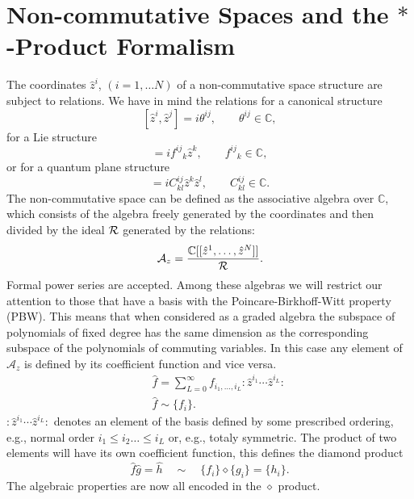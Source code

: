 \documentclass[a4paper,11pt]{article}
\newcommand{\newsection}{ \setcounter{equation}{0} \section}
\def\nn{\nonumber }
\def\Az{{\mathcal{A}_z}}
\def\z{\hat z}
\begin{document}
\newpage
\newsection{Non-commutative Spaces and the $*$-Product Formalism}

The coordinates $\z^i$, $(i=1,\ldots N)$ of a non-commutative space structure are
subject to relations. We have in mind the relations for a 
canonical structure
\begin{equation}
\label{can-struct}
  [\z^i,\z^j]=i\theta^{ij},\qquad \theta^{ij}\in\mathbb{C},
\end{equation}
for a Lie structure
\begin{equation}
  [\z^i,\z^j]=if^{ij}{}_k\z^k,\qquad f^{ij}{}_k\in\mathbb{C},
\end{equation}
or for a quantum plane structure
\begin{equation}
  [\z^i,\z^j]=iC^{ij}_{kl}\z^k\z^l, \qquad C^{ij}_{kl}\in\mathbb{C}.
\end{equation}
The non-commutative space can be defined as the associative 
algebra over $\mathbb{C}$, which consists of the algebra freely 
generated by the coordinates and then divided by the ideal ${\cal R}$ 
generated by the relations:
\begin{equation}
  \Az=\frac{\mathbb{C}[[\z^1,\ldots, \z^N]]}{\cal R}.
\end{equation}
Formal power series are accepted. Among these algebras
we will restrict our attention to those that have a basis
with the Poincare-Birkhoff-Witt property (PBW). This means that
when considered as a graded algebra the subspace of 
polynomials of fixed degree has the same dimension as the 
corresponding subspace of the polynomials of commuting variables.
In this case any element of $\Az$ is defined by its coefficient
function and vice versa.
\begin{eqnarray}
  \label{dia-prod}
  &&\hat{f}=\sum_{L=0}^{\infty}f_{i_1,\ldots, i_L}:\z^{i_1}\cdots \z^{i_L}:\nn\\
  &&\hat{f}\sim\{f_{i}\}.
\end{eqnarray}
$:\z^{i_1}\cdots \z^{i_L}:$ denotes an element of the basis defined 
by some prescribed ordering, e.g., normal order $i_1\le i_2\ldots\le i_L$ or,
e.g., totaly symmetric.   The product of two elements will have its own
coefficient function, this defines the diamond product
\begin{equation}
  \hat{f}\hat{g}=\hat{h}\quad\sim\quad\{f_i\}\diamond\{g_i\}=\{h_i\}.
\end{equation}
The algebraic properties are now all encoded in the
$\diamond$ product. 
\end{document}
